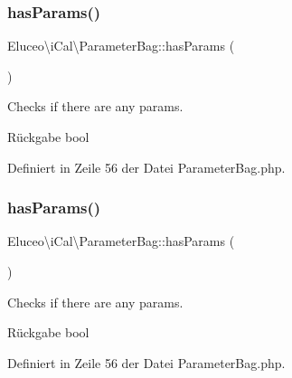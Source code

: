 \mbox{\label{class_eluceo_1_1i_cal_1_1_parameter_bag_aac985af3f6bb8a95591a6d6b553260ef}} 
\subsubsection{\texorpdfstring{has\+Params()}{hasParams()}\hspace{0.1cm}{\footnotesize\ttfamily [1/3]}}
{\footnotesize\ttfamily Eluceo\textbackslash{}i\+Cal\textbackslash{}\+Parameter\+Bag\+::has\+Params (\begin{DoxyParamCaption}{ }\end{DoxyParamCaption})}

Checks if there are any params.

\begin{DoxyReturn}{Rückgabe}
bool 
\end{DoxyReturn}


Definiert in Zeile 56 der Datei Parameter\+Bag.\+php.

\mbox{\label{class_eluceo_1_1i_cal_1_1_parameter_bag_aac985af3f6bb8a95591a6d6b553260ef}} 
\subsubsection{\texorpdfstring{has\+Params()}{hasParams()}\hspace{0.1cm}{\footnotesize\ttfamily [2/3]}}
{\footnotesize\ttfamily Eluceo\textbackslash{}i\+Cal\textbackslash{}\+Parameter\+Bag\+::has\+Params (\begin{DoxyParamCaption}{ }\end{DoxyParamCaption})}

Checks if there are any params.

\begin{DoxyReturn}{Rückgabe}
bool 
\end{DoxyReturn}


Definiert in Zeile 56 der Datei Parameter\+Bag.\+php.

